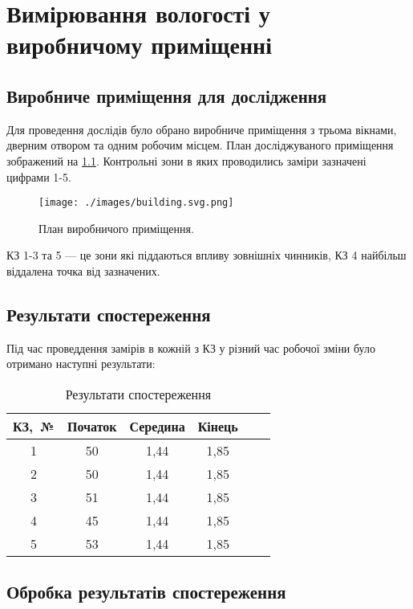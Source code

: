 \chapter{Вимірювання вологості у виробничому приміщенні}

\section{Виробниче приміщення для дослідження}

Для проведення дослідів було обрано виробниче приміщення з трьома вікнами, дверним отвором та одним
робочим місцем. План досліджуваного приміщення зображений на \ref{fig:building}. Контрольні зони в
яких проводились заміри зазначені цифрами 1-5.

\begin{figure}[h] \centering
  \texttt{[image: ./images/building.svg.png]}
  \caption{План виробничого приміщення.}
  \label{fig:building}
\end{figure}

КЗ 1-3 та 5 --- це зони які піддаються впливу зовнішніх чинників, КЗ 4 найбільш віддалена точка від
зазначених.

\section{Результати спостереження}

Під час проведдення замірів в кожній з КЗ у різний час робочої зміни було отримано наступні
результати:

\begin{table}[ht]
\caption{Результати спостереження}
\label{t:results}
\begin{tabular}{| c | c | c | c | c | c |}
\hline
\multicolumn{1}{|p{2cm}|}{КЗ,~№} &
\multicolumn{1}{C{2.2cm}|}{Початок} &
\multicolumn{1}{C{2.2cm}|}{Середина} &
\multicolumn{1}{C{2.2cm}|}{Кінець} \\ \hline 
1  & 50 & 1,44 & 1,85 \\ \hline 
2 & 50 & 1,44 & 1,85 \\ \hline 
3 & 51 & 1,44 & 1,85 \\ \hline 
4  & 45 & 1,44 & 1,85 \\ \hline 
5 & 53 & 1,44 & 1,85 \\ \hline 
\end{tabular}
\end{table}

\section{Обробка результатів спостереження}


